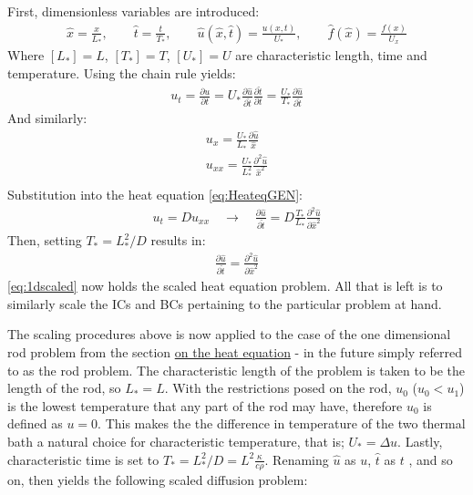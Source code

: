 \documentclass[%
oneside,                 %
final,                   %
10pt]{article}
\begin{document}
First, dimensionless variables are introduced:
\begin{align}
\hat{x}=\frac{x}{L_*}, \qquad \hat{t}=\frac{t}{T_*}, \qquad \hat{u}(\hat{x},\hat{t})=\frac{u(x,t)}{U_*},  \qquad\hat{f}(\hat{x}) =\frac{f(x)}{U_x}
\end{align}
Where $[L_*]=L$, $[T_*]=T$, $[U_*]=U$ are characteristic length, time and temperature. Using the chain rule yields:
\begin{align*}
u_t=\frac{\partial u}{\partial t}=U_* \frac{\partial \hat{u}}{\partial \hat{t}}\frac{\partial \hat{t}}{\partial t}=\frac{U_*}{T_*}\frac{\partial \hat{u}}{\partial \hat{t}} 
\end{align*}
And similarly:
\begin{align*}
u_x=\frac{U_*}{L_*}\frac{\partial \hat{u}}{\hat{x}} \\
u_{xx}=\frac{U_*}{L_*^2}\frac{\partial^2 \hat{u}}{\hat{x}^2} \\
\end{align*}
Substitution into the heat equation \eqref{eq:HeateqGEN}:
\begin{align*}
u_t=D u_{xx} \quad \rightarrow \quad \frac{\partial \hat{u}}{\partial \hat{t}}= D \frac{T_*}{L_*}\frac{\partial^2 \hat{ u}}{\partial \hat{x}^2}
\end{align*}
Then, setting $T_*=L_*^2/D$ results in: 
\begin{align}
\frac{\partial \hat{u}}{\partial \hat t}=\frac{\partial^2 \hat{u}}{\partial \hat{x}^2} \label{eq:1dscaled}
\end{align}
\eqref{eq:1dscaled} now holds the scaled heat equation problem. All that is left is to similarly scale the ICs and BCs pertaining to the particular problem at hand.\newline

The scaling procedures above is now applied to the case of the one dimensional rod problem from the section \hyperref[M.1DHQ]{on the heat equation} - in the future simply referred to as the rod problem. The characteristic length of the problem is taken to be the length of the rod, so $L_*=L$. With the restrictions posed on the rod, $u_0$ ($u_0<u_1$) is the lowest temperature that any part of the rod may have, therefore $u_0$ is defined as $u=0$. This makes the the difference in temperature of the two thermal bath a natural choice for characteristic temperature, that is; $U_*=\Delta u$. Lastly, characteristic time is set to $T_*=L_*^2/D=L^2 \frac{\kappa}{c \rho}$. Renaming $\hat{u}$ as $u$, $\hat{t}$ as $t$ , and so on, then yields the following scaled diffusion problem:
\end{document}
